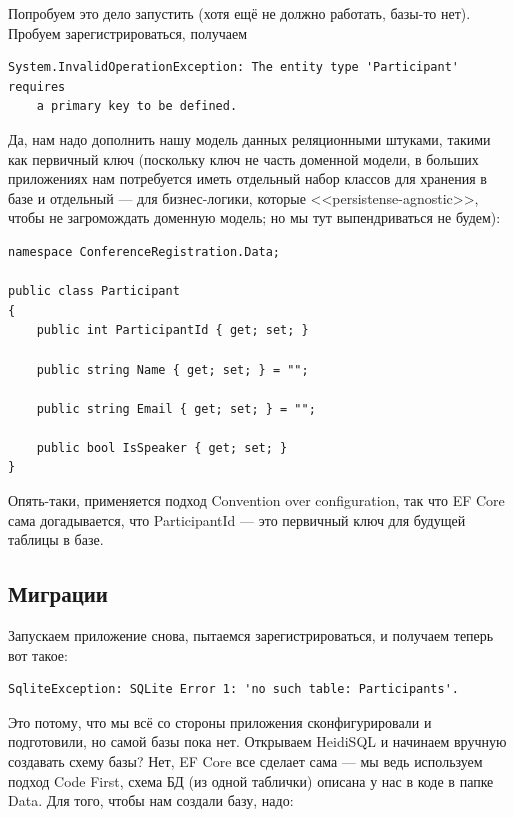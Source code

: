 \documentclass{../../text-style}
\begin{document}
Попробуем это дело запустить (хотя ещё не должно работать, базы-то нет). Пробуем зарегистрироваться, получаем 

\begin{verbatim}
System.InvalidOperationException: The entity type 'Participant' requires 
    a primary key to be defined.
\end{verbatim}

Да, нам надо дополнить нашу модель данных реляционными штуками, такими как первичный ключ (поскольку ключ не часть доменной модели, в больших приложениях нам потребуется иметь отдельный набор классов для хранения в базе и отдельный --- для бизнес-логики, которые <<persistense-agnostic>>, чтобы не загромождать доменную модель; но мы тут выпендриваться не будем):

\begin{verbatim}
namespace ConferenceRegistration.Data;

public class Participant
{
    public int ParticipantId { get; set; }

    public string Name { get; set; } = "";

    public string Email { get; set; } = "";

    public bool IsSpeaker { get; set; }
}
\end{verbatim}

Опять-таки, применяется подход Convention over configuration, так что EF Core сама догадывается, что ParticipantId --- это первичный ключ для будущей таблицы в базе.

\subsection{Миграции}

Запускаем приложение снова, пытаемся зарегистрироваться, и получаем теперь вот такое:

\begin{verbatim}
SqliteException: SQLite Error 1: 'no such table: Participants'.
\end{verbatim}

Это потому, что мы всё со стороны приложения сконфигурировали и подготовили, но самой базы пока нет. Открываем HeidiSQL и начинаем вручную создавать схему базы? Нет, EF Core все сделает сама --- мы ведь используем подход Code First, схема БД (из одной таблички) описана у нас в коде в папке Data. Для того, чтобы нам создали базу, надо:
\end{document}
